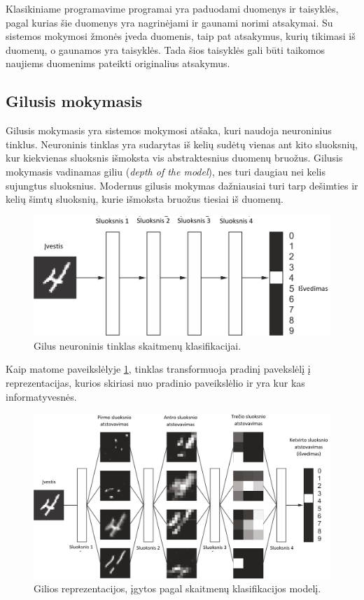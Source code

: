 \documentclass{VUMIFInfKursinis}
\begin{document}
Klasikiniame programavime programai yra paduodami duomenys ir taisyklės, pagal kurias šie duomenys yra nagrinėjami ir gaunami norimi atsakymai. Su sistemos mokymosi žmonės įveda duomenis, taip pat atsakymus, kurių tikimasi iš duomenų, o gaunamos yra taisyklės. Tada šios taisyklės gali būti taikomos naujiems duomenims pateikti originalius atsakymus. \cite{1}

\subsection{Gilusis mokymasis}

Gilusis mokymasis yra sistemos mokymosi atšaka, kuri naudoja neuroninius tinklus. Neuroninis tinklas yra sudarytas iš kelių sudėtų vienas ant kito sluoksnių, kur kiekvienas sluoksnis išmoksta vis abstraktesnius duomenų bruožus. Gilusis mokymasis vadinamas giliu (\textit{depth of the model}), nes turi daugiau nei kelis sujungtus sluoksnius. Modernus gilusis mokymas dažniausiai turi tarp dešimties ir kelių šimtų sluoksnių, kurie išmoksta bruožus tiesiai iš duomenų.

\vspace{10mm}
\begin{figure}[h!]
\centering
  \includegraphics[scale=1.3]{img/figure_1-5}
  \caption{Gilus neuroninis tinklas skaitmenų klasifikacijai.}
  \label{fig:DeepLearningDigit}
\end{figure}

Kaip matome paveikslėlyje \ref{fig:DeepLearningDigit}, tinklas transformuoja pradinį pavekslėlį į reprezentacijas, kurios skiriasi nuo pradinio paveikslėlio ir yra kur kas informatyvesnės.

\begin{figure}[h!]
\centering
  \includegraphics[scale=1.0]{img/figure_1-6}
  \caption{Gilios reprezentacijos, įgytos pagal skaitmenų klasifikacijos modelį.}
  \label{fig:DeepLearningDigit2}
\end{figure}
\end{document}
